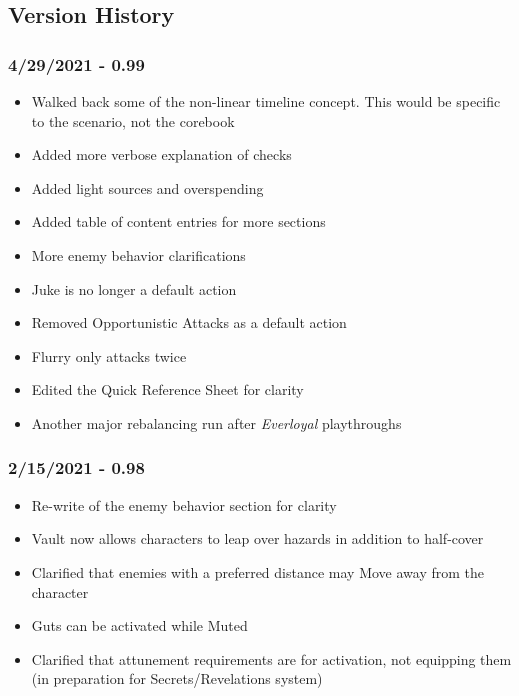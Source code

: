 \documentclass[12pt]{article}
\begin{document}
\begin{multicols*}{2}
\vfill

\pagebreak

\section{Version History}
\subsubsection*{4/29/2021 - 0.99}
\begin{itemize}
\item Walked back some of the non-linear timeline concept. This would be specific to the scenario, not the corebook
\item Added more verbose explanation of checks
\item Added light sources and overspending
\item Added table of content entries for more sections
\item More enemy behavior clarifications
\item Juke is no longer a default action
\item Removed Opportunistic Attacks as a default action
\item Flurry only attacks twice
\item Edited the Quick Reference Sheet for clarity
\item Another major rebalancing run after \emph{Everloyal} playthroughs
\end{itemize}
\subsubsection*{2/15/2021 - 0.98}
\begin{itemize}
\item Re-write of the enemy behavior section for clarity
\item Vault now allows characters to leap over hazards in addition to half-cover
\item Clarified that enemies with a preferred distance may Move away from the character
\item Guts can be activated while Muted
\item Clarified that attunement requirements are for activation, not equipping them (in preparation for Secrets/Revelations system)
\end{itemize}

\end{multicols*}
\end{document}
